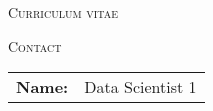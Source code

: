 \documentclass[10pt]{article}
\newlength{\oldcvlabelwidth}
\newlength{\oldcvlabelsep}
\begin{document}
\begin{cv}
\smallskip
\vspace{-1.2cm}
\begin{center}
 {\large \textsc{Curriculum vitae}\\ 
}\end{center}
 \vspace{-0.1 cm}

\setlength{\oldcvlabelwidth}{\cvlabelwidth}
\setlength{\oldcvlabelsep}{\cvlabelsep}

\setlength{\cvlabelwidth}{1em} 
\noindent\hrulefill
\begin{cvlist}{\large \textsc{Contact}}
\item \begin{tabular}{p{2cm}p{11cm}}  {\bf{Name:}} & Data Scientist 1\\
   \end{tabular}

\end{cvlist}


\end{cv}
\end{document}
